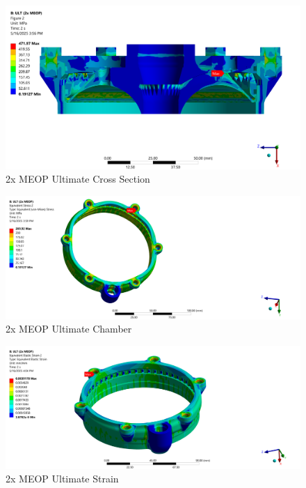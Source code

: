  \begin{figure}
     \centering
     \includegraphics[width=1\linewidth]{2x MEOP Ultimate Cross Section.png}
     \caption{2x MEOP Ultimate Cross Section}
     \label{fig:2x MEOP Ultimate Cross Section}
 \end{figure}
 \begin{figure}
     \centering
     \includegraphics[width=1\linewidth]{Images/2x MEOP Ultimate Chamber.png}
     \caption{2x MEOP Ultimate Chamber}
     \label{fig:2x MEOP Ultimate Chamber}
 \end{figure}
 \begin{figure}
     \centering
     \includegraphics[width=1\linewidth]{Images/2x MEOP Ultimate Strain.png}
     \caption{2x MEOP Ultimate Strain}
     \label{fig:2x MEOP Ultimate Strain}
 \end{figure}
